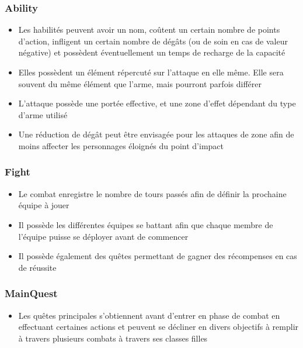 \documentclass[a4paper,12pt]{article}
\begin{document}
\subsubsection{Ability}
\begin{itemize}
\item Les habilités peuvent avoir un nom, coûtent un certain nombre de points d'action, infligent un certain nombre de dégâts (ou de soin en cas de valeur négative) et possèdent éventuellement un temps de recharge de la capacité
\item Elles possèdent un élément répercuté sur l'attaque en elle même. Elle sera souvent du même élément que l'arme, mais pourront parfois différer
\item L'attaque possède une portée effective, et une zone d'effet dépendant du type d'arme utilisé
\item Une réduction de dégât peut être envisagée pour les attaques de zone afin de moins affecter les personnages éloignés du point d'impact
\end{itemize}

\subsubsection{Fight}
\begin{itemize}
\item Le combat enregistre le nombre de tours passés afin de définir la prochaine équipe à jouer
\item Il possède les différentes équipes se battant afin que chaque membre de l'équipe puisse se déployer avant de commencer
\item Il possède également des quêtes permettant de gagner des récompenses en cas de réussite
\end{itemize}

\subsubsection{MainQuest}
\begin{itemize}
\item Les quêtes principales s'obtiennent avant d'entrer en phase de combat en effectuant certaines actions et peuvent se décliner en divers objectifs à remplir à travers plusieurs combats à travers ses classes filles
\end{itemize}
\end{document}
